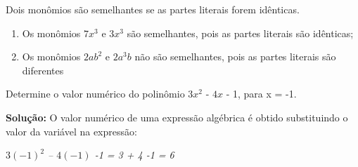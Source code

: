 \begin{tdefinicao}
Dois monômios são semelhantes se as partes literais forem idênticas.
\end{tdefinicao}

\begin{texemplo}
\begin{enumerate}[label=(\textbf{\alph*)}]
    \item Os monômios $7x^3$ e $3x^3$ são semelhantes, pois as partes literais são idênticas;
    
    \item Os monômios  $2ab^2$ e $2a^3b$ não são semelhantes, pois as partes literais são diferentes \qedsymbol
\end{enumerate}
\end{texemplo}

\begin{texemplo}

Determine o valor numérico do polinômio $3x^2$ - $4x$ - 1, para x = -1. 

\textbf{Solução:} O valor numérico de uma expressão algébrica é obtido substituindo o valor da variável na expressão:

\emph{$3(-1)^2$ – $4(-1)$ -1 = 3 + 4 -1 = 6} \qedsymbol
\end{texemplo}


